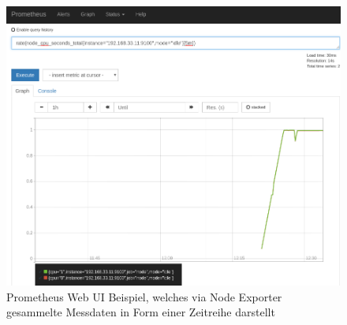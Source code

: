 \documentclass[titlepage]{report}
\begin{document}
\begin{figure}[H]
    \centering
    \includegraphics[width=1.0\textwidth]{figures/prometheus_web_ui.png}
    \caption{Prometheus Web UI Beispiel, welches via Node Exporter
    gesammelte Messdaten in Form einer Zeitreihe darstellt}\label{fig:prometheuswebui}
\end{figure}
\end{document}
